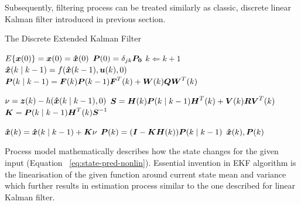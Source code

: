 Subsequently, filtering process can be treated similarly as classic, discrete linear Kalman filter introduced in previous section. 
\begin{algorithm}%
\caption{The Discrete Extended Kalman Filter} \label{alg:ekf}
\begin{algorithmic}
\REQUIRE $E\lbrace \boldsymbol{x}(0) \rbrace = \boldsymbol{x}(0) = \boldsymbol{\hat{x}}(0)$
\REQUIRE $\boldsymbol{P}(0) = \delta_{jk} \boldsymbol{P_{0}} $ 
\LOOP 
	\STATE $k \Leftarrow k+1$ 
	\STATE $\boldsymbol{\hat{x}}(k \mid k-1) = f(\boldsymbol{\hat{x}}(k-1), \boldsymbol{u}(k), 0)$
	\STATE $\boldsymbol{P}(k \mid k-1) = \boldsymbol{F}(k) \boldsymbol{P}(k-1) \boldsymbol{F}^{T}(k) + \boldsymbol{W}(k) \boldsymbol{Q} \boldsymbol{W}^{T}(k)$
	
	\STATE $\nu = \boldsymbol{z}(k) - h(\boldsymbol{\hat{x}}(k \mid k-1), 0)$	
	\STATE $\boldsymbol{S} = \boldsymbol{H}(k) \boldsymbol{P}(k \mid k-1) \boldsymbol{H}^{T}(k) + \boldsymbol{V}(k) \boldsymbol{R} \boldsymbol{V}^{T}(k)$	
	\STATE $\boldsymbol{K} = \boldsymbol{P}(k \mid k-1) \boldsymbol{H}^{T}(k) \boldsymbol{S}^{-1}$	
	
	\STATE $\boldsymbol{\hat{x}}(k) = \boldsymbol{\hat{x}}(k \mid k-1) + \boldsymbol{K} \nu$
	\STATE $\boldsymbol{P}(k) = (\boldsymbol{I}-\boldsymbol{K}\boldsymbol{H}(k))\boldsymbol{P}(k \mid k-1)$
	\RETURN $\boldsymbol{\hat{x}}(k), \boldsymbol{P}(k)$
\ENDLOOP
\end{algorithmic}
\end{algorithm}
Process model mathematically describes how the state changes for the given input (Equation ~\ref{eq:state-pred-nonlin}). Essential invention in EKF algorithm is the linearisation of the given function around current state mean and variance which further results in estimation process similar to the one described for linear Kalman filter.
